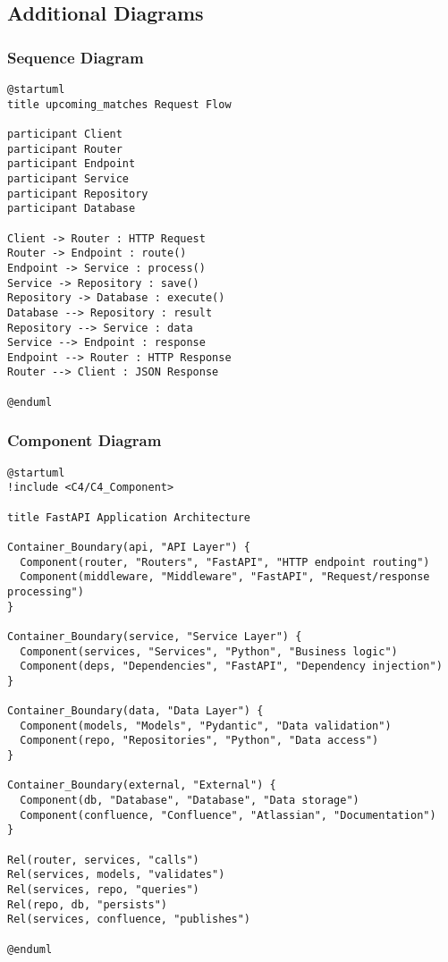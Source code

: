 \documentclass[11pt,a4paper]{article}
\begin{document}
\subsection{Additional Diagrams}

\subsubsection{Sequence Diagram}

\begin{lstlisting}[language={}]
@startuml
title upcoming_matches Request Flow

participant Client
participant Router
participant Endpoint
participant Service
participant Repository
participant Database

Client -> Router : HTTP Request
Router -> Endpoint : route()
Endpoint -> Service : process()
Service -> Repository : save()
Repository -> Database : execute()
Database --> Repository : result
Repository --> Service : data
Service --> Endpoint : response
Endpoint --> Router : HTTP Response
Router --> Client : JSON Response

@enduml
\end{lstlisting}
\subsubsection{Component Diagram}

\begin{lstlisting}[language={}]
@startuml
!include <C4/C4_Component>

title FastAPI Application Architecture

Container_Boundary(api, "API Layer") {
  Component(router, "Routers", "FastAPI", "HTTP endpoint routing")
  Component(middleware, "Middleware", "FastAPI", "Request/response processing")
}

Container_Boundary(service, "Service Layer") {
  Component(services, "Services", "Python", "Business logic")
  Component(deps, "Dependencies", "FastAPI", "Dependency injection")
}

Container_Boundary(data, "Data Layer") {
  Component(models, "Models", "Pydantic", "Data validation")
  Component(repo, "Repositories", "Python", "Data access")
}

Container_Boundary(external, "External") {
  Component(db, "Database", "Database", "Data storage")
  Component(confluence, "Confluence", "Atlassian", "Documentation")
}

Rel(router, services, "calls")
Rel(services, models, "validates")
Rel(services, repo, "queries")
Rel(repo, db, "persists")
Rel(services, confluence, "publishes")

@enduml
\end{lstlisting}
\end{document}
